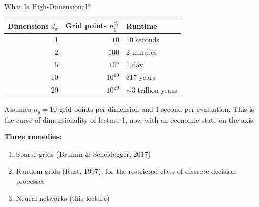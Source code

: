 \documentclass[aspectratio=169,11pt]{beamer}
\newcommand{\emphc}[1]{\textcolor{harvardcrimson}{#1}}
\begin{document}
\begin{frame}{What Is High-Dimensional?}
\begin{center}
\begin{tabular}{rrl}
\toprule
\textbf{Dimensions $d_x$} & \textbf{Grid points $n_g^{d_x}$} & \textbf{Runtime} \\
\midrule
1 & $10$ & 10 seconds \\
2 & $100$ & 2 minutes \\
5 & $10^5$ & 1 day \\
10 & $10^{10}$ & 317 years \\
20 & $10^{20}$ & $\sim 3$ trillion years \\
\bottomrule
\end{tabular}
\end{center}

\vspace{0.5em}
{\small Assumes $n_g = 10$ grid points per dimension and 1 second per evaluation. This is the curse of dimensionality of lecture 1, now with an economic state on the axis.}

\vspace{0.5em}
\textbf{Three remedies:}
\begin{enumerate}
    \item \emphc{Sparse grids} (Brumm \& Scheidegger, 2017)
    \item \emphc{Random grids} (Rust, 1997), for the restricted class of discrete decision processes
    \item \emphc{Neural networks} (this lecture)
\end{enumerate}
\end{frame}
\end{document}
